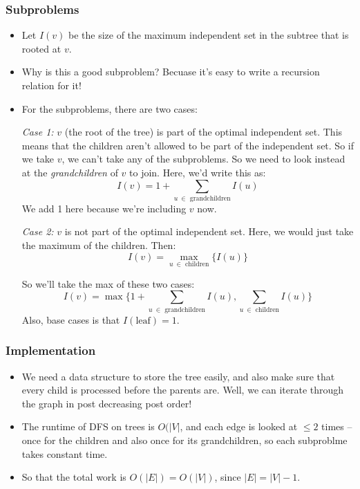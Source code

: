 \subsubsection{Subproblems}
\begin{itemize}
	\item Let \(I(v)\) be the size of the maximum independent set in the subtree that is rooted at \(v\). 
	\item Why is this a good subproblem? Becuase it's easy to write a recursion relation for it!
	\item For the subproblems, there are two cases:

		\textit{Case 1:} \(v\) (the root of the tree) is part of the optimal independent set. This 
		means that the children aren't allowed to be part of the independent set. So if we take $v$, we can't 
		take any of the subproblems. So we need to look instead at the \textit{grandchildren} of \(v\) to join.
		Here, we'd write this as:
		\[
			I(v) = 1 + \sum_{u\  \in \text{ grandchildren}} I(u)
		\] 
		We add 1 here because we're including \(v\) now. 

		\textit{Case 2:} \( v\) is not part of the optimal independent set. Here, we would just take 
		the maximum of the children. Then:
		\[
			I(v) = \max_{u \ \in \text{ children}} \{I(u)\} 
		\] 


		So we'll take the max of these two cases:
		\[
		I(v) = \max \{1 + \sum_{u \ \in \text{ grandchildren}} I(u), \sum_{u \ \in \text{ children}} I(u)\}
		\] 
		Also, base cases is that $I(\text{leaf}) = 1$. 
\end{itemize}
\subsubsection{Implementation}
\begin{itemize}
	\item We need a data structure to store the tree easily, and also make sure that every child is processed 
		before the parents are. Well, we can iterate through the graph in post decreasing post order! 
	\item The runtime of DFS on trees is \(O(|V|\), and each edge is looked at \(\le 2\) times -- once 
		for the children and also once for its grandchildren, so each subproblme takes constant time. 
	\item So that the total work is \(O(|E|) = O(|V|)\), since \(|E| = |V| - 1\).
\end{itemize}
